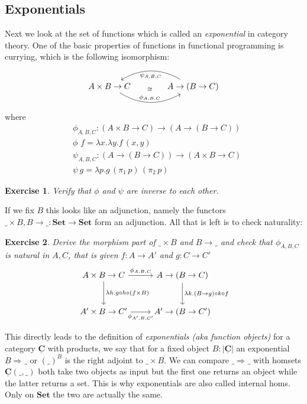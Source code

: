 \documentclass{article}
\newcommand{\Set}{\mathbf{Set}}
\newcommand{\cat}[1]{\underline{\mathbf{#1}}}
\newcommand{\obj}[1]{|#1|}
\newcommand{\homC}[3]{\cat{#1}(#2,#3)}
\newcommand{\expC}[3]{#2\Rightarrow_{#1} #3}
\newtheorem{exercise}{Exercise}
\begin{document}
\subsection{Exponentials}
\label{sec:exponentials}

Next we look at the set of functions which is called an \emph{exponential} in category theory. One of the basic properties of functions in functional programming is currying, which is the following isomorphism:
\[\begin{tikzcd}[column sep = large]
A\times B \to C \arrow[r,"\phi_{A,B,C}",bend right,"\cong" above=11] & A\to(B \to C) \arrow[l,"\psi_{A,B,C}",bend right]
\end{tikzcd}\]
where
\begin{align*}
  &\phi_{A,B,C} : (A\times B \to C) \to (A\to(B \to C))\\
  &\phi\,\,f = \lambda x.\lambda y.f\,(x,y)\\
  &\psi_{A,B,C} : (A\to(B \to C)) \to (A\times B \to C) \\
  &\psi\,g = \lambda p.g\,(\pi_1\,p)\,(\pi_2\,p)
\end{align*}
\begin{exercise}
  Verify that $\phi$ and $\psi$ are inverse to each other.
\end{exercise}
If we fix $B$ this looks like an adjunction, namely the functors $\_\times B, B \to \_ : \Set \to \Set$ form an adjunction. All that is left is to check naturality:
\begin{exercise}
  Derive the morphism part of $\_\times B$ and $B \to \_$ and
  check that $\phi_{A,B,C}$ is natural in $A,C$, that is given $f : A \to A'$ and $g : C \to C'$
\[\begin{tikzcd}[row sep = large]
   A\times B \to C \arrow[r,"\phi_{A,B,C}"] \arrow[d,"\lambda h. g\circ h \circ (f \times B)"] & A\to(B \to C) \arrow[d,"\lambda k. (B \to g)\circ k \circ f"] \\
   A'\times B \to C'  \arrow[r,"\phi_{A',B,C'}" below]  & A'\to(B \to C') 
\end{tikzcd}\]  
\end{exercise}

This directly leads to the definition of \emph{exponentials (aka function objects)} for a category $\cat{C}$ with products, we say that for a fixed object $B:\obj{\cat{C}}$ an exponential $\expC{}{B}{\_}$ or $(\_)^B$ is the right adjoint to $\_ \times B$. We can compare $\expC{}{\_}{\_}$ with homsets $\homC{C}{\_}{\_}$ both take two objects as input but the first one returns an object while the latter returns a set. This is why exponentials are also called internal homs. Only on $\Set$ the two are actually the same.
\end{document}
